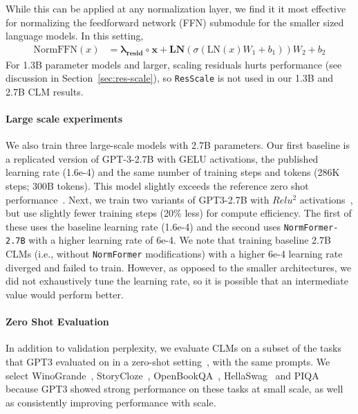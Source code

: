 \documentclass{article} %
\begin{document}
While this can be applied at any normalization layer, we find it it most effective for normalizing the feedforward network (FFN) submodule for the smaller sized language models.
In this setting, 
\begin{align*}
\mathrm{NormFFN}(x) &= {\bm{\lambda}_{\bm{resid}}~{\bm{\circ}}~\bm{x}} + \mathrm{\textbf{LN}}(\sigma(\mathrm{LN}(x)W_1 + b_1)) W_2 + b_2
\end{align*}
For 1.3B parameter models and larger, scaling residuals hurts performance (see discussion in Section~\ref{sec:res-scale}), so \texttt{ResScale} is not used in our 1.3B and 2.7B CLM results.

\paragraph{Large scale experiments}
We also train three large-scale models with 2.7B parameters.
Our first baseline is a replicated version of GPT-3-2.7B with GELU activations, the published learning rate (1.6e-4) and the same number of training steps and tokens (286K steps; 300B tokens). This model slightly exceeds the reference zero shot performance~\citep{brown2020gpt3}.
Next, we train two variants of GPT3-2.7B with $Relu^{2}$ activations~\citep{so2021primer}, but use slightly fewer training steps (20\% less) for compute efficiency.
The first of these uses the baseline learning rate (1.6e-4) and the second uses \texttt{NormFormer-2.7B} with a higher learning rate of 6e-4.
We note that training baseline 2.7B CLMs (i.e., without \texttt{NormFormer} modifications) with a higher 6e-4 learning rate diverged and failed to train.
However, as opposed to the smaller architectures, we did not exhaustively tune the learning rate, so it is possible that an intermediate value would perform better.

\paragraph{Zero Shot Evaluation}
In addition to validation perplexity, we evaluate CLMs on a subset of the tasks that GPT3 evaluated on in a zero-shot setting~\citep{ brown2020gpt3}, with the same prompts. We select WinoGrande~\citep{sakaguchi2020winogrande}, StoryCloze~\citep{mostafazadeh-etal-2016-corpus}, OpenBookQA~\citep{mihaylov-etal-2018-suit}, HellaSwag~\citep{zellers-etal-2019-hellaswag} and PIQA~\citep{bisk2020piqa} because GPT3 showed strong performance on these tasks at small scale, as well as consistently improving performance with scale.
\end{document}
